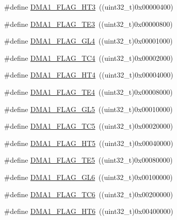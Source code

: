 \begin{DoxyCompactItemize}
\item 
\#define \mbox{\hyperlink{group___d_m_a__flags__definition_ga9c801c1702fcc41b74bb7397ce80a8fc}{D\+M\+A1\+\_\+\+F\+L\+A\+G\+\_\+\+H\+T3}}~((uint32\+\_\+t)0x00000400)
\item 
\#define \mbox{\hyperlink{group___d_m_a__flags__definition_gaa0b3d86f09829d0388273f0cd51698cc}{D\+M\+A1\+\_\+\+F\+L\+A\+G\+\_\+\+T\+E3}}~((uint32\+\_\+t)0x00000800)
\item 
\#define \mbox{\hyperlink{group___d_m_a__flags__definition_gace751c9c8aa57b154d61865625cca25b}{D\+M\+A1\+\_\+\+F\+L\+A\+G\+\_\+\+G\+L4}}~((uint32\+\_\+t)0x00001000)
\item 
\#define \mbox{\hyperlink{group___d_m_a__flags__definition_ga78f2798eca161493d5dc6058f65b0f17}{D\+M\+A1\+\_\+\+F\+L\+A\+G\+\_\+\+T\+C4}}~((uint32\+\_\+t)0x00002000)
\item 
\#define \mbox{\hyperlink{group___d_m_a__flags__definition_ga12ad5a2c8cd9778fecf88d1dab7626d4}{D\+M\+A1\+\_\+\+F\+L\+A\+G\+\_\+\+H\+T4}}~((uint32\+\_\+t)0x00004000)
\item 
\#define \mbox{\hyperlink{group___d_m_a__flags__definition_ga53beafec27ed89735e83fc7577a00d39}{D\+M\+A1\+\_\+\+F\+L\+A\+G\+\_\+\+T\+E4}}~((uint32\+\_\+t)0x00008000)
\item 
\#define \mbox{\hyperlink{group___d_m_a__flags__definition_ga173d8dadcbf3d96911a43eedf53bd64e}{D\+M\+A1\+\_\+\+F\+L\+A\+G\+\_\+\+G\+L5}}~((uint32\+\_\+t)0x00010000)
\item 
\#define \mbox{\hyperlink{group___d_m_a__flags__definition_ga438d3577b5b5b6c2c0cf1008296c23bb}{D\+M\+A1\+\_\+\+F\+L\+A\+G\+\_\+\+T\+C5}}~((uint32\+\_\+t)0x00020000)
\item 
\#define \mbox{\hyperlink{group___d_m_a__flags__definition_ga648a2eb0b008ab009f03d207596c3cd7}{D\+M\+A1\+\_\+\+F\+L\+A\+G\+\_\+\+H\+T5}}~((uint32\+\_\+t)0x00040000)
\item 
\#define \mbox{\hyperlink{group___d_m_a__flags__definition_ga17b9793d2f78c683f7c48ba4f7fa2e70}{D\+M\+A1\+\_\+\+F\+L\+A\+G\+\_\+\+T\+E5}}~((uint32\+\_\+t)0x00080000)
\item 
\#define \mbox{\hyperlink{group___d_m_a__flags__definition_gab21d0196f89435f61bedd03d53edc093}{D\+M\+A1\+\_\+\+F\+L\+A\+G\+\_\+\+G\+L6}}~((uint32\+\_\+t)0x00100000)
\item 
\#define \mbox{\hyperlink{group___d_m_a__flags__definition_ga85276600ddf436d4f268199e0df9c54a}{D\+M\+A1\+\_\+\+F\+L\+A\+G\+\_\+\+T\+C6}}~((uint32\+\_\+t)0x00200000)
\item 
\#define \mbox{\hyperlink{group___d_m_a__flags__definition_ga0d594cb12f86f19c9562d82c3ca505bc}{D\+M\+A1\+\_\+\+F\+L\+A\+G\+\_\+\+H\+T6}}~((uint32\+\_\+t)0x00400000)

\end{DoxyCompactItemize}
